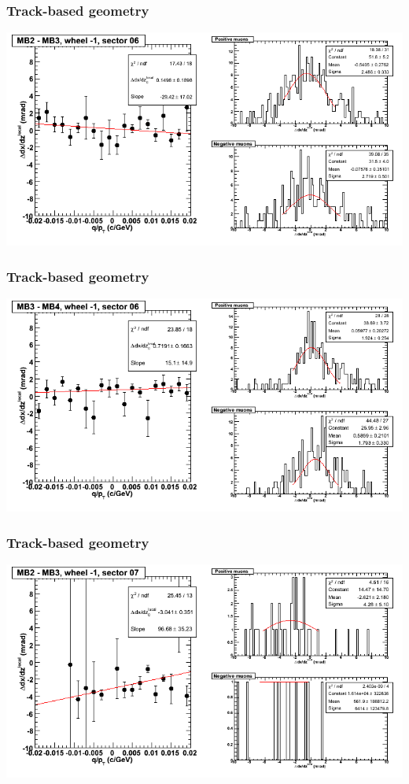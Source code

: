 \documentclass[compress]{beamer}
\begin{document}
\begin{frame}
\frametitle{Track-based geometry}
\includegraphics[width=\linewidth]{NOV4_segdiffs/dt13_slope_B_06_23.png}
\end{frame}

\begin{frame}
\frametitle{Track-based geometry}
\includegraphics[width=\linewidth]{NOV4_segdiffs/dt13_slope_B_06_34.png}
\end{frame}

\begin{frame}
\frametitle{Track-based geometry}
\includegraphics[width=\linewidth]{NOV4_segdiffs/dt13_slope_B_07_23.png}
\end{frame}
\end{document}
